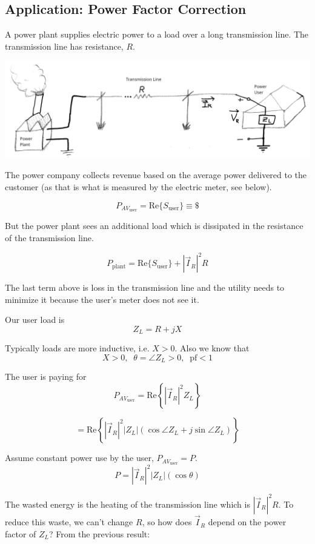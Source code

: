 \subsection{Application: Power Factor Correction}

A power plant supplies electric power to a load over a long transmission line.
The transmission line has resistance, $R$.

\includegraphics[width=\textwidth]{figsChapt03/BN97423.png}


The power company collects revenue based on the average power delivered
to the customer (as that is what is measured by the electric meter, see below).


\[
P_{AV_{\text{user}}} = \text{Re}\{S_{\text{user}}\} \equiv  \$
\]

But the power plant sees an additional load which is dissipated in the
resistance of the transmission line.


\[
P_{\text{plant}} = \text{Re}\{S_{\text{user}}\} + |\vec{I}_R|^2 R
\]


The last term above is loss in the transmission line and the utility needs
 to minimize it because the user's meter does not see it.

Our user load is
\[
Z_L = R + jX
\]

Typically loads are more inductive, i.e. $X>0$.  Also we know that
\[
X>0,\;\; \theta = \angle Z_L > 0, \;\; \text{pf} < 1
\]

The user is paying for
\[
P_{AV_{\text{user}}} = \text{Re}\left\{ |\vec{I}_R|^2 Z_L \right\}
\]

\[
= \text{Re}\left\{ |\vec{I}_R|^2 |Z_L| (\cos \angle Z_L + j \sin \angle Z_L) \right\}
\]


\noindent Assume constant power use by the user, $P_{AV_{\text{user}}} = P$.
\[
P = |\vec{I}_R|^2 |Z_L| (\cos \theta)
\]

The wasted energy is the heating of the transmission line which is  $|\vec{I}_R|^2R$.
To reduce this waste, we can't change $R$,
so how does $\vec{I}_R$ depend on the power factor of $Z_L$?
From the previous result:

